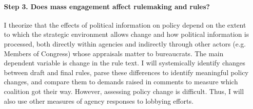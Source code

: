 





\paragraph{Step 3. Does mass engagement affect rulemaking and rules?} I theorize that the effects of political information on policy depend on the extent to which the strategic environment allows change and how political information is processed, both directly within agencies and indirectly through other actors (e.g. Members of Congress) whose appraisals matter to bureaucrats.
The main dependent variable is change in the rule text.
I will systemically identify changes between draft and final rules, parse these differences to identify meaningful policy changes, and compare them to demands raised in comments to measure which coalition got their way. However, assessing policy change is difficult. Thus, I will also use other measures of agency responses to lobbying efforts. %



